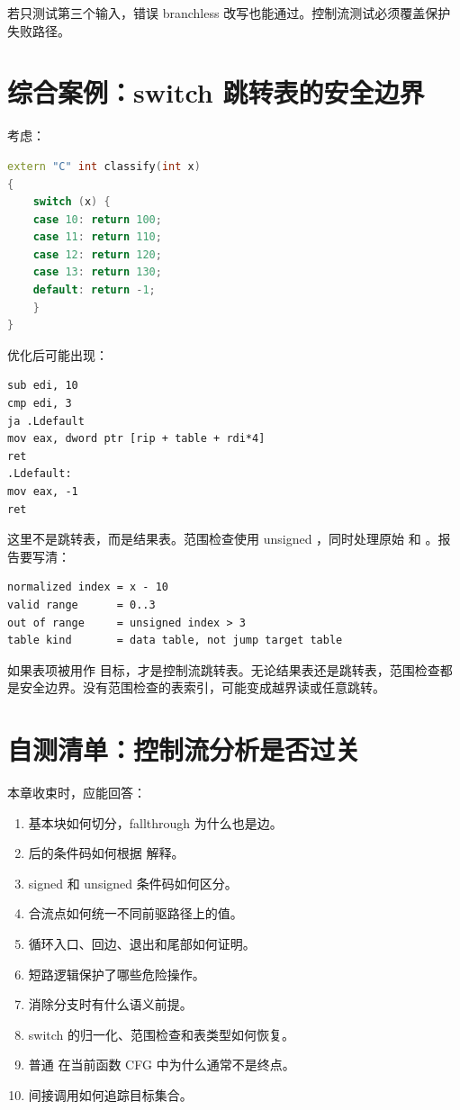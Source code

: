 若只测试第三个输入，错误 branchless 改写也能通过。控制流测试必须覆盖保护失败路径。

\section{综合案例：switch 跳转表的安全边界}

考虑：

\begin{lstlisting}[language=C++]
extern "C" int classify(int x)
{
    switch (x) {
    case 10: return 100;
    case 11: return 110;
    case 12: return 120;
    case 13: return 130;
    default: return -1;
    }
}
\end{lstlisting}

优化后可能出现：

\begin{lstlisting}
sub edi, 10
cmp edi, 3
ja .Ldefault
mov eax, dword ptr [rip + table + rdi*4]
ret
.Ldefault:
mov eax, -1
ret
\end{lstlisting}

这里不是跳转表，而是结果表。范围检查使用 unsigned ，同时处理原始  和 。报告要写清：

\begin{lstlisting}
normalized index = x - 10
valid range      = 0..3
out of range     = unsigned index > 3
table kind       = data table, not jump target table
\end{lstlisting}

如果表项被用作  目标，才是控制流跳转表。无论结果表还是跳转表，范围检查都是安全边界。没有范围检查的表索引，可能变成越界读或任意跳转。

\section{自测清单：控制流分析是否过关}

本章收束时，应能回答：

\begin{enumerate}
  \item 基本块如何切分，fallthrough 为什么也是边。
  \item {} 后的条件码如何根据  解释。
  \item signed 和 unsigned 条件码如何区分。
  \item 合流点如何统一不同前驱路径上的值。
  \item 循环入口、回边、退出和尾部如何证明。
  \item 短路逻辑保护了哪些危险操作。
  \item {} 消除分支时有什么语义前提。
  \item switch 的归一化、范围检查和表类型如何恢复。
  \item 普通  在当前函数 CFG 中为什么通常不是终点。
  \item 间接调用如何追踪目标集合。
\end{enumerate}

